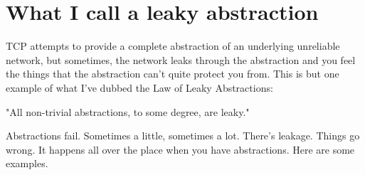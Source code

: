 \documentclass{article}
\begin{document}
\newpage

\section{What I call a leaky abstraction}
 TCP attempts to provide a complete abstraction of an underlying unreliable network, but sometimes, the network leaks through the abstraction and you feel the things that the abstraction can't quite protect you from. This is but one example of what I've dubbed the Law of Leaky Abstractions:

"All non-trivial abstractions, to some degree, are leaky."

Abstractions fail. Sometimes a little, sometimes a lot. There's leakage. Things go wrong. It happens all over the place when you have abstractions. Here are some examples.
\end{document}
